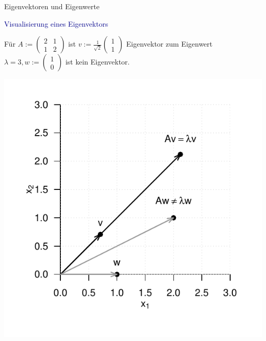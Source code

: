 \documentclass[
  8pt,
  ignorenonframetext,
]{beamer}
\begin{document}
\begin{frame}[t]{Eigenvektoren und Eigenwerte}
\protect\hypertarget{eigenvektoren-und-eigenwerte-2}{}
\vspace{2mm}

\textcolor{darkblue}{Visualisierung eines Eigenvektors} \footnotesize
\vspace{2mm}

Für \(A := \begin{pmatrix} 2 & 1 \\ 1 & 2 \end{pmatrix}\) ist
\(v := \frac{1}{\sqrt{2}} \begin{pmatrix} 1 \\ 1 \end{pmatrix}\)
Eigenvektor zum Eigenwert
\(\lambda = 3, w := \begin{pmatrix} 1 \\ 0 \end{pmatrix}\) ist kein
Eigenvektor.

\center

\begin{center}\includegraphics[width=0.55\linewidth]{4_Abbildungen/mvda_4_eigenvektor} \end{center}
\end{frame}
\end{document}
